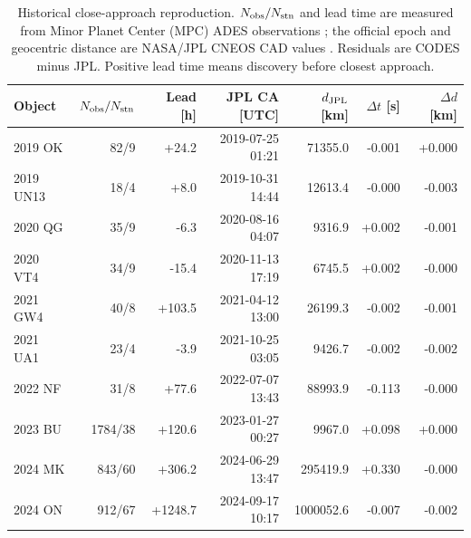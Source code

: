 \begin{table}[H]
\centering
\footnotesize
\caption{Historical close-approach reproduction. $N_{\rm obs}/N_{\rm stn}$ and lead time are measured from Minor Planet Center (MPC) ADES observations \cite{MPCObservations}; the official epoch and geocentric distance are NASA/JPL CNEOS CAD values \cite{JPLCAD}. Residuals are CODES minus JPL. Positive lead time means discovery before closest approach.}
\label{tab:neo-ca-validation}
\begin{tabularx}{\textwidth}{@{}l r r r r r r@{}}
\toprule
\color{cGold}\textbf{Object} & \color{cGold}\textbf{$N_{\rm obs}/N_{\rm stn}$} & \color{cGold}\textbf{Lead [h]} & \color{cGold}\textbf{JPL CA [UTC]} & \color{cGold}\textbf{$d_{\rm JPL}$ [km]} & \color{cGold}\textbf{$\Delta t$ [s]} & \color{cGold}\textbf{$\Delta d$ [km]}\\
\midrule
2019 OK & 82/9 & +24.2 & 2019-07-25 01:21 & 71355.0 & -0.001 & +0.000\\
2019 UN13 & 18/4 & +8.0 & 2019-10-31 14:44 & 12613.4 & -0.000 & -0.003\\
2020 QG & 35/9 & -6.3 & 2020-08-16 04:07 & 9316.9 & +0.002 & -0.001\\
2020 VT4 & 34/9 & -15.4 & 2020-11-13 17:19 & 6745.5 & +0.002 & -0.000\\
2021 GW4 & 40/8 & +103.5 & 2021-04-12 13:00 & 26199.3 & -0.002 & -0.001\\
2021 UA1 & 23/4 & -3.9 & 2021-10-25 03:05 & 9426.7 & -0.002 & -0.002\\
2022 NF & 31/8 & +77.6 & 2022-07-07 13:43 & 88993.9 & -0.113 & -0.000\\
2023 BU & 1784/38 & +120.6 & 2023-01-27 00:27 & 9967.0 & +0.098 & +0.000\\
2024 MK & 843/60 & +306.2 & 2024-06-29 13:47 & 295419.9 & +0.330 & -0.000\\
2024 ON & 912/67 & +1248.7 & 2024-09-17 10:17 & 1000052.6 & -0.007 & -0.002\\
\bottomrule
\end{tabularx}
\end{table}


